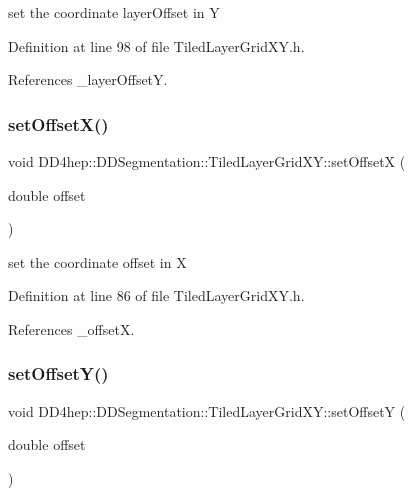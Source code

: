set the coordinate layer\+Offset in Y 



Definition at line 98 of file Tiled\+Layer\+Grid\+X\+Y.\+h.



References \+\_\+layer\+OffsetY.

\hypertarget{class_d_d4hep_1_1_d_d_segmentation_1_1_tiled_layer_grid_x_y_a19c0059402e512da58c2d241d8e67de7}{}\label{class_d_d4hep_1_1_d_d_segmentation_1_1_tiled_layer_grid_x_y_a19c0059402e512da58c2d241d8e67de7} 
\subsubsection{\texorpdfstring{set\+Offset\+X()}{setOffsetX()}}
{\footnotesize\ttfamily void D\+D4hep\+::\+D\+D\+Segmentation\+::\+Tiled\+Layer\+Grid\+X\+Y\+::set\+OffsetX (\begin{DoxyParamCaption}\item[{double}]{offset }\end{DoxyParamCaption})\hspace{0.3cm}{\ttfamily [inline]}}



set the coordinate offset in X 



Definition at line 86 of file Tiled\+Layer\+Grid\+X\+Y.\+h.



References \+\_\+offsetX.

\hypertarget{class_d_d4hep_1_1_d_d_segmentation_1_1_tiled_layer_grid_x_y_a588e04b48f59f73af89b54302e3eb025}{}\label{class_d_d4hep_1_1_d_d_segmentation_1_1_tiled_layer_grid_x_y_a588e04b48f59f73af89b54302e3eb025} 
\subsubsection{\texorpdfstring{set\+Offset\+Y()}{setOffsetY()}}
{\footnotesize\ttfamily void D\+D4hep\+::\+D\+D\+Segmentation\+::\+Tiled\+Layer\+Grid\+X\+Y\+::set\+OffsetY (\begin{DoxyParamCaption}\item[{double}]{offset }\end{DoxyParamCaption})\hspace{0.3cm}{\ttfamily [inline]}}



